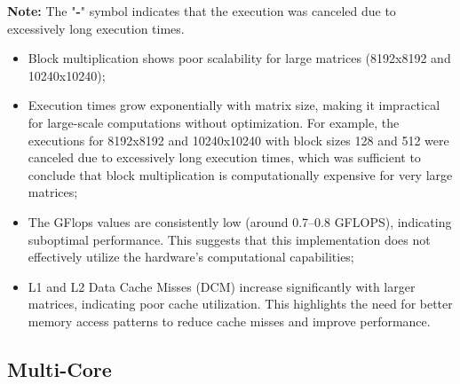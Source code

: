 \documentclass{article}
\begin{document}
\textbf{Note:} The "\textbf{-}" symbol indicates that the execution was canceled due to excessively long execution times.
\begin{itemize}
    \item Block multiplication shows poor scalability for large matrices (8192x8192 and 10240x10240);
    \item Execution times grow exponentially with matrix size, making it impractical for large-scale computations without optimization. For example, the executions for 8192x8192 and 10240x10240 with block sizes 128 and 512 were canceled due to excessively long execution times, which was sufficient to conclude that block multiplication is computationally expensive for very large matrices;
    \item The GFlops values are consistently low (around 0.7–0.8 GFLOPS), indicating suboptimal performance. This suggests that this implementation does not effectively utilize the hardware's computational capabilities;
    \item L1 and L2 Data Cache Misses (DCM) increase significantly with larger matrices, indicating poor cache utilization. This highlights the need for better memory access patterns to reduce cache misses and improve performance.
\end{itemize}

\subsection{Multi-Core}
\end{document}
